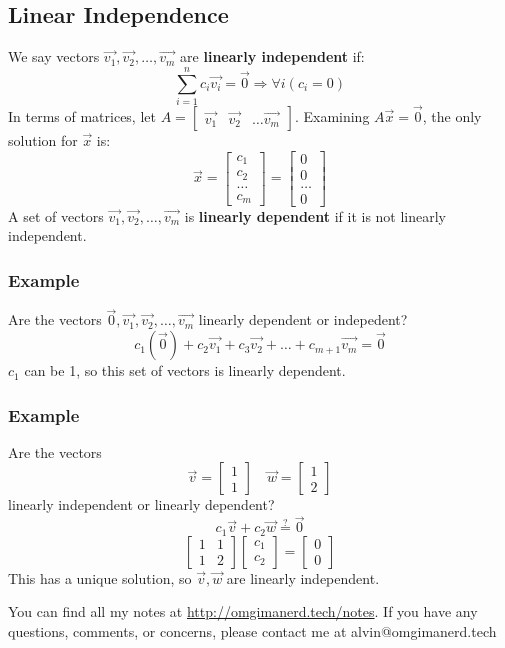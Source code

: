 \documentclass[letterpaper, 12pt]{math}
\begin{document}
\subsection*{Linear Independence}
We say vectors \( \vec{v_1},\vec{v_2},\dots,\vec{v_m} \) are \textbf{linearly
independent} if:
\[ \sum_{i=1}^{n}c_i\vec{v_i} = \vec{0} \Rightarrow \forall{i}(c_i = 0) \]
In terms of matrices, let \( A = \begin{bmatrix}\vec{v_1} & \vec{v_2} & \dots
\vec{v_m}\end{bmatrix} \). Examining \( A\vec{x} = \vec{0} \), the only
solution for \( \vec{x} \) is:
\[ \vec{x} = \begin{bmatrix}c_1 \\ c_2 \\ \dots \\ c_m\end{bmatrix} =
  \begin{bmatrix} 0 \\ 0 \\ \dots \\ 0\end{bmatrix} \]
A set of vectors \( \vec{v_1},\vec{v_2},\dots,\vec{v_m} \) is \textbf{linearly
dependent} if it is not linearly independent.

\subsubsection*{Example}
Are the vectors \( \vec{0},\vec{v_1},\vec{v_2},\dots,\vec{v_m} \) linearly
dependent or indepedent?
\[ c_1(\vec{0})+c_2\vec{v_1}+c_3\vec{v_2}+\dots+c_{m+1}\vec{v_m} = \vec{0} \]
\( c_1 \) can be 1, so this set of vectors is linearly dependent.

\subsubsection*{Example}
Are the vectors
\[ \vec{v} = \begin{bmatrix}1 \\ 1\end{bmatrix}\quad
  \vec{w} = \begin{bmatrix}1 \\ 2\end{bmatrix} \]
linearly independent or linearly dependent?
\[ c_1\vec{v}+c_2\vec{w} \stackrel{?}{=} \vec{0} \]
\[ \begin{bmatrix}1 & 1 \\ 1 & 2\end{bmatrix}
  \begin{bmatrix}c_1 \\ c_2\end{bmatrix} =
  \begin{bmatrix}0 \\ 0\end{bmatrix} \]
This has a unique solution, so \( \vec{v},\vec{w} \) are linearly independent.

\begin{center}
  You can find all my notes at \url{http://omgimanerd.tech/notes}. If you have
  any questions, comments, or concerns, please contact me at
  alvin@omgimanerd.tech
\end{center}
\end{document}
